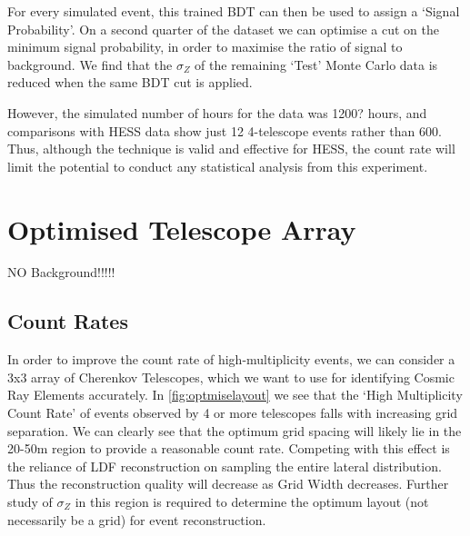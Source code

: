 \documentclass[11pt]{article}
\begin{document}
For every simulated event, this trained BDT can then be used to assign a \textquoteleft Signal Probability'. On a second quarter of the dataset we can optimise a cut on the minimum signal probability, in order to maximise the ratio of signal to background. We find that the $\sigma_{Z}$ of the remaining \textquoteleft Test' Monte Carlo data is reduced when the same BDT cut is applied.

However, the simulated number of hours for the data was 1200? hours, and comparisons with HESS data show just 12 4-telescope events rather than 600. Thus, although the technique is valid and effective for HESS, the count rate will limit the potential to conduct any statistical analysis from this experiment.

\section{Optimised Telescope Array}
NO Background!!!!!
\subsection{Count Rates}

In order to improve the count rate of high-multiplicity events, we can consider a 3x3 array of Cherenkov Telescopes, which we want to use for identifying Cosmic Ray Elements accurately. In \ref{fig:optmiselayout} we see that the \textquoteleft High Multiplicity Count Rate' of events observed by 4 or more telescopes falls with increasing grid separation. We can clearly see that the optimum grid spacing will likely lie in the 20-50m region to provide a reasonable count rate. Competing with this effect is the reliance of LDF reconstruction on sampling the entire lateral distribution. Thus the reconstruction quality will decrease as Grid Width decreases. Further study of $\sigma_{Z}$ in this region is required to determine the optimum layout (not necessarily be a grid) for event reconstruction. 
\end{document}

